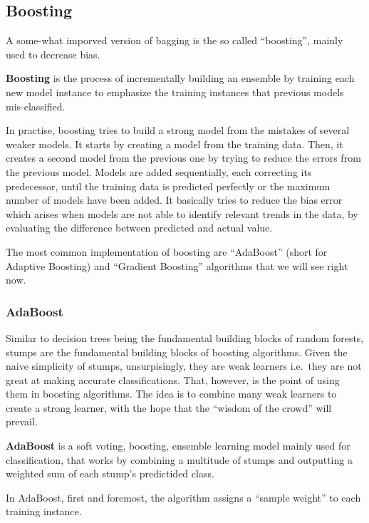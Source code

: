 \subsection{Boosting}

A some-what imporved version of bagging is the so called ``boosting'', mainly used to decrease bias.

\bd[Boosting]
\textbf{Boosting} is the process of incrementally building an ensemble by training each new model instance to emphasize
the training instances that previous models mis-classified.
\ed

In practise, boosting tries to build a strong model from the mistakes of several weaker models. It starts by
creating a model from the training data. Then, it creates a second model from the previous one by trying to reduce
the errors from the previous model. Models are added sequentially, each correcting its predecessor, until the
training data is predicted perfectly or the maximum number of models have been added. It basically tries to reduce
the bias error which arises when models are not able to identify relevant trends in the data, by evaluating the
difference between predicted and actual value.


The most common implementation of boosting are ``AdaBoost'' (short for Adaptive  Boosting) and ``Gradient Boosting''
algorithms that we will see right now.

\subsubsection{AdaBoost}

Similar to decision trees being the fundamental building blocks of random forests, stumps are the fundamental
building blocks of boosting algorithms. Given the naive simplicity of stumps, unsurpisingly, they are weak learners
i.e.\ they are not great at making accurate classifications. That, however, is the point of using them in boosting
algorithms. The idea is to combine many weak learners to create a strong learner, with the hope that the ``wisdom of
the crowd'' will prevail.

\bd[AdaBoost]
\textbf{AdaBoost} is a soft voting, boosting, ensemble learning model mainly used for classification, that works by
combining a multitude of stumps and outputting a weighted sum of each stump's predictided class.
\ed

In AdaBoost, first and foremost, the algorithm assigns a ``sample weight'' to each training instance.

